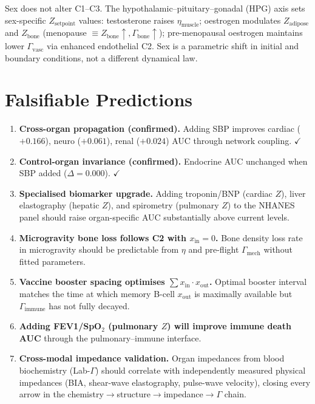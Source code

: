 \documentclass[aps,pre,twocolumn,superscriptaddress,floatfix]{revtex4-2}
\begin{document}
Sex does not alter C1--C3.  The hypothalamic--pituitary--gonadal
(HPG) axis sets sex-specific $Z_{\text{setpoint}}$ values:
testosterone raises $\eta_{\text{muscle}}$;
oestrogen modulates $Z_{\text{adipose}}$ and $Z_{\text{bone}}$
(menopause $\equiv Z_{\text{bone}} \uparrow,
\Gamma_{\text{bone}} \uparrow$);
pre-menopausal oestrogen maintains lower
$\Gamma_{\text{vasc}}$ via enhanced endothelial C2.
Sex is a parametric shift in initial and boundary
conditions, not a different dynamical law.




\section{Falsifiable Predictions}
\label{sec:predictions}

\begin{enumerate}
  \item \textbf{Cross-organ propagation (confirmed).}
    Adding SBP improves cardiac ($+0.166$), neuro ($+0.061$),
    renal ($+0.024$) AUC through network coupling.
    $\checkmark$

  \item \textbf{Control-organ invariance (confirmed).}
    Endocrine AUC unchanged when SBP added
    ($\Delta = 0.000$). $\checkmark$

  \item \textbf{Specialised biomarker upgrade.}
    Adding troponin/BNP (cardiac $Z$), liver elastography
    (hepatic $Z$), and spirometry (pulmonary $Z$) to
    the NHANES panel should raise organ-specific AUC
    substantially above current levels.

  \item \textbf{Microgravity bone loss follows C2 with
    $x_{\text{in}} = 0$.}
    Bone density loss rate in microgravity should be
    predictable from $\eta$ and pre-flight
    $\Gamma_{\text{mech}}$ without fitted parameters.

  \item \textbf{Vaccine booster spacing optimises
    $\sum x_{\text{in}} \cdot x_{\text{out}}$.}
    Optimal booster interval matches the time at which
    memory B-cell $x_{\text{out}}$ is maximally
    available but $\Gamma_{\text{immune}}$ has not
    fully decayed.

  \item \textbf{Adding FEV1/SpO$_2$ (pulmonary $Z$)
    will improve immune death AUC}
    through the pulmonary--immune interface.

  \item \textbf{Cross-modal impedance validation.}
    Organ impedances from blood biochemistry (Lab-$\Gamma$)
    should correlate with independently measured physical
    impedances (BIA, shear-wave elastography, pulse-wave
    velocity), closing every arrow in the
    chemistry$\to$structure$\to$impedance$\to\Gamma$ chain.


\end{enumerate}
\end{document}
